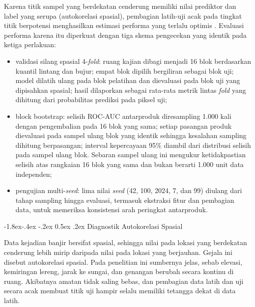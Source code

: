 \documentclass[12pt,a4paper]{article}
\makeatletter
\renewcommand\subsubsection{\@startsection{subsubsection}{3}{\z@}%
  {-1.8ex\@plus -.4ex \@minus -.2ex}%
  {0.5ex \@plus .2ex}%
  {\normalfont\normalsize\bfseries}}
\makeatother
\begin{document}
Karena titik sampel yang berdekatan cenderung memiliki nilai prediktor dan
label yang serupa (autokorelasi spasial), pembagian latih-uji acak pada
tingkat titik berpotensi menghasilkan estimasi performa yang terlalu optimis
\citep{roberts2017,ploton2020}. Evaluasi performa karena itu diperkuat dengan
tiga skema pengecekan yang identik pada ketiga perlakuan:

\begin{itemize}
\item validasi silang spasial 4-\textit{fold}: ruang kajian dibagi
menjadi 16 blok berdasarkan kuantil lintang dan bujur; empat blok dipilih
bergiliran sebagai blok uji; model dilatih ulang pada blok pelatihan dan
dievaluasi pada blok uji yang dipisahkan spasial; hasil dilaporkan sebagai
rata-rata metrik lintas \textit{fold} yang dihitung dari probabilitas
prediksi pada piksel uji;
\item block bootstrap: selisih ROC-AUC antarproduk diresampling
1.000 kali dengan pengembalian pada 16 blok yang sama; setiap pasangan
produk dievaluasi pada sampel ulang blok yang identik sehingga kesalahan
sampling dihitung berpasangan; interval kepercayaan 95\% diambil dari
distribusi selisih pada sampel ulang blok. Sebaran sampel ulang ini mengukur
ketidakpastian selisih atas rangkaian 16 blok yang sama dan bukan berarti
1.000 unit data independen;
\item pengujian multi-\textit{seed}: lima nilai \textit{seed}
(42, 100, 2024, 7, dan 99) diulang dari tahap sampling hingga evaluasi,
termasuk ekstraksi fitur dan pembagian data, untuk memeriksa konsistensi
arah peringkat antarproduk.
\end{itemize}

\subsubsection{Diagnostik Autokorelasi Spasial}

Data kejadian banjir bersifat spasial, sehingga nilai pada lokasi yang
berdekatan cenderung lebih mirip daripada nilai pada lokasi yang berjauhan.
Gejala ini disebut autokorelasi spasial. Pada penelitian ini sumbernya jelas,
sebab elevasi, kemiringan lereng, jarak ke sungai, dan genangan berubah
secara kontinu di ruang. Akibatnya amatan tidak saling bebas, dan pembagian
data latih dan uji secara acak membuat titik uji hampir selalu memiliki
tetangga dekat di data latih.
\end{document}
